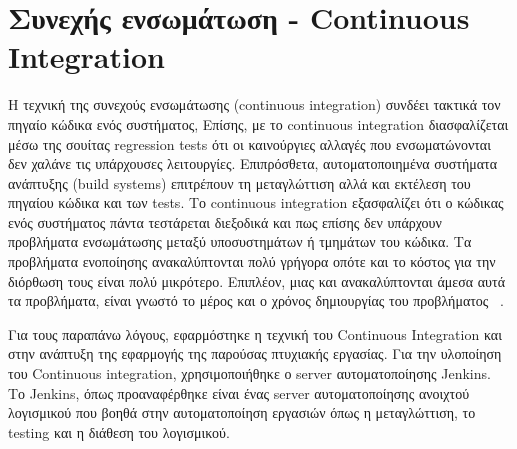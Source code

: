 \documentclass[oneside, 12pt]{book}
\begin{document}
\section{Συνεχής ενσωμάτωση - Continuous Integration}
Η τεχνική της συνεχούς ενσωμάτωσης (continuous integration) συνδέει 
τακτικά τον πηγαίο κώδικα ενός συστήματος,
Επίσης, με το continuous integration διασφαλίζεται μέσω της σουίτας 
regression tests ότι οι καινούργιες αλλαγές που ενσωματώνονται δεν χαλάνε τις υπάρχουσες λειτουργίες.
Επιπρόσθετα, αυτοματοποιημένα συστήματα ανάπτυξης (build systems) 
 επιτρέπουν τη μεταγλώττιση αλλά και εκτέλεση του 
πηγαίου κώδικα και των tests.
Το continuous integration εξασφαλίζει ότι ο κώδικας ενός συστήματος 
πάντα τεστάρεται διεξοδικά και πως επίσης δεν υπάρχουν προβλήματα 
ενσωμάτωσης μεταξύ υποσυστημάτων ή τμημάτων του κώδικα.
Τα προβλήματα ενοποίησης ανακαλύπτονται πολύ γρήγορα οπότε και το 
κόστος για την διόρθωση τους είναι πολύ μικρότερο.
Επιπλέον, μιας και ανακαλύπτονται άμεσα αυτά τα προβλήματα, είναι γνωστό το μέρος και ο χρόνος δημιουργίας του προβλήματος
~\cite{karlesky2008agile}.

Για τους παραπάνω λόγους, εφαρμόστηκε η τεχνική του Continuous 
Integration και στην ανάπτυξη της εφαρμογής της παρούσας πτυχιακής 
εργασίας.
Για την υλοποίηση του Continuous integration, χρησιμοποιήθηκε ο server αυτοματοποίησης Jenkins.
Το Jenkins, όπως προαναφέρθηκε είναι ένας server αυτοματοποίησης 
ανοιχτού λογισμικού που βοηθά στην αυτοματοποίηση εργασιών όπως η μεταγλώττιση, το testing και η διάθεση του λογισμικού.
\end{document}
